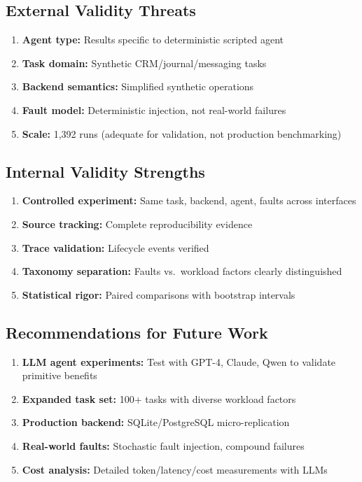 \subsection{External Validity Threats}

\begin{enumerate}
    \item \textbf{Agent type:} Results specific to deterministic scripted agent
    \item \textbf{Task domain:} Synthetic CRM/journal/messaging tasks
    \item \textbf{Backend semantics:} Simplified synthetic operations
    \item \textbf{Fault model:} Deterministic injection, not real-world failures
    \item \textbf{Scale:} 1,392 runs (adequate for validation, not production benchmarking)
\end{enumerate}

\subsection{Internal Validity Strengths}

\begin{enumerate}
    \item \textbf{Controlled experiment:} Same task, backend, agent, faults across interfaces
    \item \textbf{Source tracking:} Complete reproducibility evidence
    \item \textbf{Trace validation:} Lifecycle events verified
    \item \textbf{Taxonomy separation:} Faults vs.\ workload factors clearly distinguished
    \item \textbf{Statistical rigor:} Paired comparisons with bootstrap intervals
\end{enumerate}

\subsection{Recommendations for Future Work}

\begin{enumerate}
    \item \textbf{LLM agent experiments:} Test with GPT-4, Claude, Qwen to validate primitive benefits
    \item \textbf{Expanded task set:} 100+ tasks with diverse workload factors
    \item \textbf{Production backend:} SQLite/PostgreSQL micro-replication
    \item \textbf{Real-world faults:} Stochastic fault injection, compound failures
    \item \textbf{Cost analysis:} Detailed token/latency/cost measurements with LLMs
\end{enumerate}

